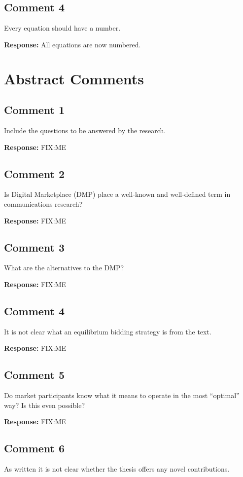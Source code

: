 \documentclass[10pt,a4paper,notitlepage]{article}
\numberwithin{equation}{section}
\begin{document}
\subsection{Comment 4}
Every equation should have a number.

\textbf{Response:}
All equations are now numbered.

\clearpage

\setcounter{section}{0}
\renewcommand{\thesection}{A}
\renewcommand{\thesubsection}{A\arabic{subsection}}
\section{Abstract Comments}
\subsection{Comment 1}
Include the questions to be answered by the research.

\textbf{Response:}
FIX:ME

\subsection{Comment 2}
Is Digital Marketplace (DMP) place a well-known and well-defined term in communications research?

\textbf{Response:}
FIX:ME

\subsection{Comment 3}
What are the alternatives to the DMP?

\textbf{Response:}
FIX:ME

\subsection{Comment 4}
It is not clear what an equilibrium bidding strategy is from the text.

\textbf{Response:}
FIX:ME

\subsection{Comment 5}
Do market participants know what it means to operate in the most ``optimal'' way? Is this even possible?

\textbf{Response:}
FIX:ME

\subsection{Comment 6}
As written it is not clear whether the thesis offers any novel contributions.
\end{document}
